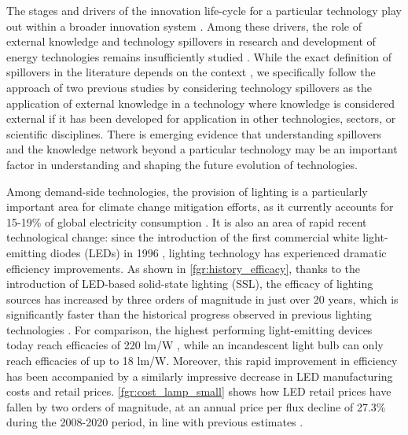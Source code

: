 \documentclass[parskip=full]{article}
\begin{document}
The stages and drivers of the innovation life-cycle for a particular technology play out within a broader innovation system \cite{grubler2012policies, Anadon2016}. Among these drivers, the role of external knowledge and technology spillovers in research and development of energy technologies remains insufficiently studied \cite{Stephan2021}. While the exact definition of spillovers in the literature depends on the context \cite{Nemet2012, kolesnikov2020novel}, we specifically follow the approach of two previous studies \cite{Stephan2021, kolesnikov2020novel} by considering technology spillovers as the application of external knowledge in a technology where knowledge is considered external  if it has been developed for application in other technologies, sectors, or scientific disciplines. There is emerging evidence that understanding spillovers and the knowledge network beyond a particular technology may be an important factor in understanding \cite{Pichler2020, iea2020cleanenergy} and shaping \cite{Clark2016, Stephan2021} the future evolution of technologies.

Among demand-side technologies, the provision of lighting is a particularly important area for climate change mitigation efforts, as it currently   accounts for 15-19\% of global electricity consumption \cite{Zissis2016,doe_electricity}. It is also an area of rapid recent technological change: since the introduction of the first commercial white light-emitting diodes (LEDs) in 1996 \cite{Nakamura2013}, lighting technology has experienced dramatic efficiency improvements.  As shown in  \cref{fgr:history_efficacy}, thanks to the introduction of LED-based solid-state lighting (SSL), the efficacy of lighting sources has increased by three orders of magnitude in just over 20 years, which is significantly faster than the historical progress observed in previous lighting technologies \cite{weinold2021quantifying}. For comparison, the highest performing light-emitting devices today reach efficacies of 220 lm/W \cite{lumistrips2021mid}, while an incandescent light bulb can only reach efficacies of up to 18 lm/W. Moreover, this rapid improvement in efficiency has been accompanied by a similarly impressive decrease in LED manufacturing costs and retail prices. \cref{fgr:cost_lamp_small} shows how LED retail prices have fallen by two orders of magnitude, at an annual price per flux decline of 27.3\% during the 2008-2020 period, in line with previous estimates \cite{Gerke2020}.
\end{document}
